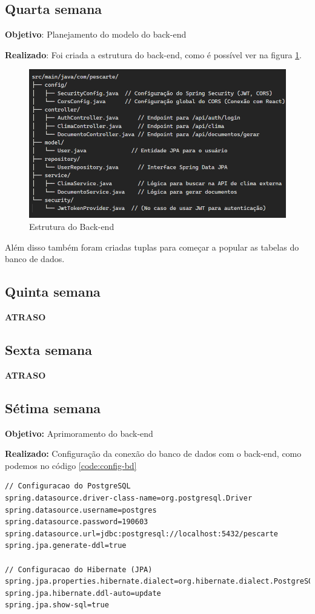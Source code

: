 \documentclass[a4paper]{abntex2}
\begin{document}
\subsection{Quarta semana}

\textbf{Objetivo}: Planejamento do modelo do back-end

\textbf{Realizado}: Foi criada a estrutura do back-end, como é possível ver na figura \ref{fig:estrutura-back-end}.

\begin{figure}[H]
    \centering
    \includegraphics[width=0.9\linewidth]{imagens/estrutura-back-end.png}
    \caption{Estrutura do Back-end}
    \label{fig:estrutura-back-end}
\end{figure}

Além disso também foram criadas tuplas para começar a popular as tabelas do banco de dados.

\subsection{Quinta semana}

\textbf{ATRASO}

\subsection{Sexta semana}

\textbf{ATRASO}

\subsection{Sétima semana}

\textbf{Objetivo:} Aprimoramento do back-end

\textbf{Realizado:} Configuração da conexão do banco de dados com o back-end, como podemos no código \ref{code:config-bd}

\begin{lstlisting}[caption={Conexão banco de dados com back-end}, label={code:config-bd}]
// Configuracao do PostgreSQL
spring.datasource.driver-class-name=org.postgresql.Driver
spring.datasource.username=postgres
spring.datasource.password=190603
spring.datasource.url=jdbc:postgresql://localhost:5432/pescarte
spring.jpa.generate-ddl=true

// Configuracao do Hibernate (JPA)
spring.jpa.properties.hibernate.dialect=org.hibernate.dialect.PostgreSQLDialect
spring.jpa.hibernate.ddl-auto=update
spring.jpa.show-sql=true
\end{lstlisting}
\end{document}
